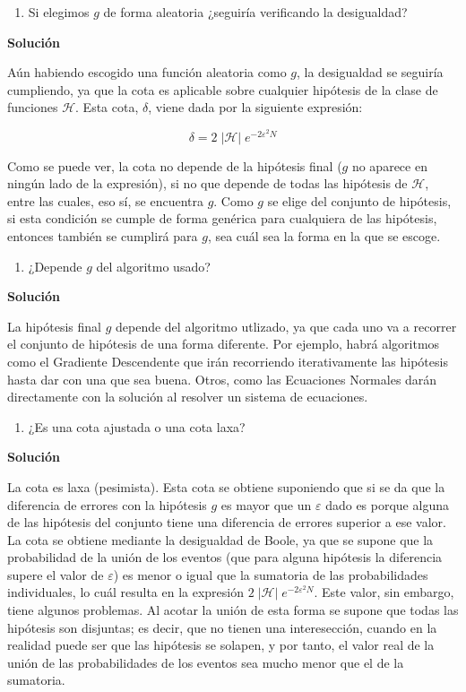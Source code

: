 \documentclass[11pt,a4paper]{article}
\newcommand{\answer}{\noindent\textbf{Solución}}
\begin{document}
\begin{enumerate}[resume,label=\textit{\alph*})]
	\item Si elegimos $g$ de forma aleatoria ¿seguiría verificando la desigualdad?
\end{enumerate}

\answer

Aún habiendo escogido una función aleatoria como $g$, la desigualdad se seguiría cumpliendo, ya que la cota es aplicable
sobre cualquier hipótesis de la clase de funciones $\mathcal{H}$. Esta cota, $\delta$, viene dada por la siguiente expresión:

\[ \delta = 2 \; | \mathcal{H} | \; e^{-2 \varepsilon^2 N} \]

Como se puede ver, la cota no depende de la hipótesis final ($g$ no aparece en ningún lado de la expresión), si no que
depende de todas las hipótesis de $\mathcal{H}$, entre las cuales, eso sí, se encuentra $g$. Como $g$ se elige del
conjunto de hipótesis, si esta condición se cumple de forma genérica para cualquiera de las hipótesis, entonces también
se cumplirá para $g$, sea cuál sea la forma en la que se escoge.

\begin{enumerate}[resume,label=\textit{\alph*})]
	\item ¿Depende $g$ del algoritmo usado?
\end{enumerate}

\answer

La hipótesis final $g$ depende del algoritmo utlizado, ya que cada uno va a recorrer el conjunto de hipótesis de una forma
diferente. Por ejemplo, habrá algoritmos como el Gradiente Descendente que irán recorriendo iterativamente las hipótesis
hasta dar con una que sea buena. Otros, como las Ecuaciones Normales darán directamente con la solución al resolver un
sistema de ecuaciones.

\begin{enumerate}[resume,label=\textit{\alph*})]
	\item ¿Es una cota ajustada o una cota laxa?
\end{enumerate}

\answer

La cota es laxa (pesimista). Esta cota se obtiene suponiendo que si se da que la diferencia de errores con la 
hipótesis $g$ es mayor que un $\varepsilon$ dado es porque alguna de las hipótesis del conjunto tiene una diferencia de
errores superior a ese valor. La cota se obtiene mediante la desigualdad de Boole, ya que se supone que la probabilidad de la
unión de los eventos (que para alguna hipótesis la diferencia supere el valor de $\varepsilon$) es menor o igual que la
sumatoria de las probabilidades individuales, lo cuál resulta en la expresión
$2 \; | \mathcal{H} | \; e^{-2 \varepsilon^2 N}$. Este valor, sin embargo, tiene algunos problemas. Al acotar la unión de esta
forma se supone que todas las hipótesis son disjuntas; es decir, que no tienen una interesección, cuando en la realidad puede
ser que las hipótesis se solapen, y por tanto, el valor real de la unión de las probabilidades de los eventos sea mucho
menor que el de la sumatoria.
\end{document}
